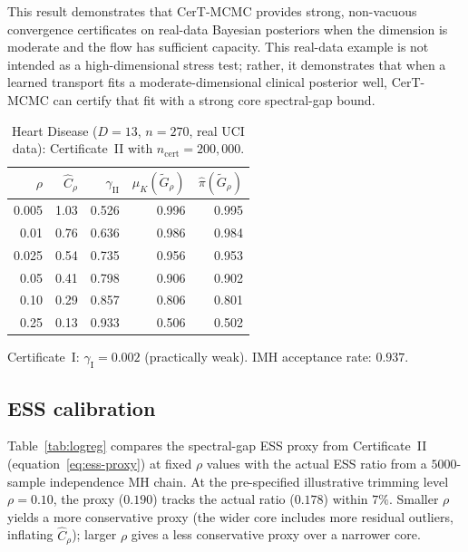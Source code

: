 \documentclass[12pt]{article}
\begin{document}
This result demonstrates that CerT-MCMC provides strong, non-vacuous convergence certificates on real-data Bayesian posteriors when the dimension is moderate and the flow has sufficient capacity.
This real-data example is not intended as a high-dimensional stress test; rather, it demonstrates that when a learned transport fits a moderate-dimensional clinical posterior well, CerT-MCMC can certify that fit with a strong core spectral-gap bound.

\begin{table}[H]
\centering
\caption{Heart Disease ($D = 13$, $n = 270$, real UCI data): Certificate~II with $n_{\mathrm{cert}} = 200{,}000$.}
\label{tab:heart}
\begin{tabular}{rrrrr}
\toprule
$\rho$ & $\hat{C}_\rho$ & $\gamma_{\mathrm{II}}$ & $\mu_K(\tilde{G}_\rho)$ & $\hat{\pi}(\tilde{G}_\rho)$ \\
\midrule
0.005 & 1.03 & 0.526 & 0.996 & 0.995 \\
0.01  & 0.76 & 0.636 & 0.986 & 0.984 \\
0.025 & 0.54 & 0.735 & 0.956 & 0.953 \\
0.05  & 0.41 & 0.798 & 0.906 & 0.902 \\
0.10  & 0.29 & 0.857 & 0.806 & 0.801 \\
0.25  & 0.13 & 0.933 & 0.506 & 0.502 \\
\bottomrule
\end{tabular}

\smallskip
\begin{minipage}{\linewidth}
\small Certificate~I: $\gamma_{\mathrm{I}} = 0.002$ (practically weak). IMH acceptance rate: $0.937$.
\end{minipage}
\end{table}


\subsection{ESS calibration}\label{sec:ess-calibration}

Table~\ref{tab:logreg} compares the spectral-gap ESS proxy from Certificate~II (equation~\ref{eq:ess-proxy}) at fixed $\rho$ values with the actual ESS ratio from a $5000$-sample independence MH chain.
At the pre-specified illustrative trimming level $\rho = 0.10$, the proxy ($0.190$) tracks the actual ratio ($0.178$) within $7\%$.
Smaller $\rho$ yields a more conservative proxy (the wider core includes more residual outliers, inflating $\hat{C}_\rho$); larger $\rho$ gives a less conservative proxy over a narrower core.
\end{document}
